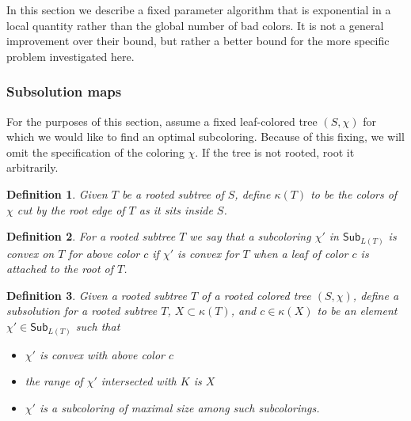 \documentclass{amsart}
\newcommand{\col}{\chi}
\newcommand{\subcol}{\chi'}
\newcommand{\subcolS}{\mathsf{Sub}}
\newcommand{\subcolST}{\subcolS_{L(T)}}
\newcommand{\cut}{\kappa}
\newtheorem{defn}{Definition}
\begin{document}
In this section we describe a fixed parameter algorithm that is exponential in a local quantity rather than the global number of bad colors.
It is not a general improvement over their bound, but rather a better bound for the more specific problem investigated here.


\subsubsection{Subsolution maps}

For the purposes of this section, assume a fixed leaf-colored tree $(S, \col)$ for which we would like to find an optimal subcoloring.
Because of this fixing, we will omit the specification of the coloring $\col$.
If the tree is not rooted, root it arbitrarily.

\begin{defn}
  Given $T$ be a rooted subtree of $S$, define $\cut(T)$ to be the colors of $\col$ cut by the root edge of $T$ as it sits inside $S$.
\end{defn}


\begin{defn}
  For a rooted subtree $T$ we say that a subcoloring $\subcol$ in $\subcolST$ is convex on $T$ for above color $c$ if $\subcol$ is convex for $T$ when a leaf of color $c$ is attached to the root of $T$.
\end{defn}

\begin{defn}
  \label{defn:subsolution}
  Given a rooted subtree $T$ of a rooted colored tree $(S, \col)$, define a subsolution for a rooted subtree $T$, $X \subset \cut(T)$, and $c \in \cut(X)$ to be an element $\subcol \in \subcolST$ such that
  \begin{itemize}
    \item $\subcol$ is convex with above color $c$
    \item the range of $\subcol$ intersected with $K$ is $X$
    \item $\subcol$ is a subcoloring of maximal size among such subcolorings.
  \end{itemize}
\end{defn}
\end{document}
